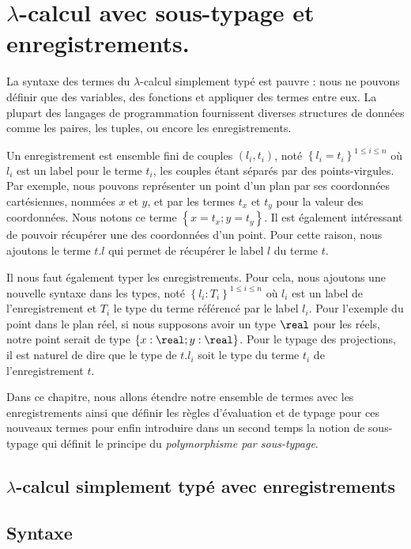 \chapter{$\lambda$-calcul avec sous-typage et enregistrements.}
\label{chapter:lambda-calculus-with-records}

La syntaxe des termes du $\lambda$-calcul simplement typé est pauvre : nous ne pouvons définir que des
variables, des fonctions et appliquer des termes entre eux.
La plupart des langages de programmation fournissent diverses structures de
données comme les paires, les tuples, ou encore les enregistrements.

Un enregistrement est ensemble fini de couples $(l_{i}, t_{i})$, noté $\left\{
  l_{i} = t_{i} \right\}^{1 \leq i \leq n}$ où $l_{i}$ est
un label pour le terme $t_{i}$, les couples étant séparés par des
points-virgules. Par exemple, nous pouvons représenter un point d'un plan par
ses coordonnées cartésiennes, nommées $x$ et $y$, et par les termes $t_{x}$ et
$t_{y}$ pour la valeur des coordonnées. Nous notons ce terme $\left\{ x = t_{x}
; y = t_{y} \right\}$. Il est également intéressant de pouvoir récupérer une des
coordonnées d'un point. Pour cette raison, nous ajoutons le terme $t.l$ qui permet de
récupérer le label $l$ du terme $t$.

Il nous faut également typer les enregistrements. Pour cela, nous ajoutons une
nouvelle syntaxe dans les types, noté $\left\{l_{i} : T_{i}\right\}^{1 \leq i
  \leq n}$ où $l_{i}$
est un label de l'enregistrement et $T_{i}$ le type du terme référencé par le
label $l_{i}$. Pour l'exemple du point dans le plan réel, si nous supposons avoir un
type $\real$ pour les réels, notre point serait de type $\left\{ x : \real ; y : \real
\right\}$. Pour le typage des projections, il est naturel de dire que le type de
$t.l_{i}$ soit le type du terme $t_{i}$ de l'enregistrement $t$.

Dans ce chapitre, nous allons étendre notre ensemble de termes avec les
enregistrements ainsi que définir les règles d'évaluation et de typage pour ces
nouveaux termes pour enfin introduire dans un second temps la notion de
sous-typage qui définit le principe du \textit{polymorphisme par sous-typage}.

\section{$\lambda$-calcul simplement typé avec enregistrements}

\section*{Syntaxe}

